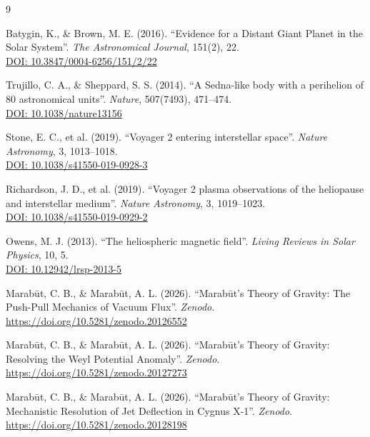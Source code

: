 \documentclass[11pt, a4paper]{article}
\newcommand{\doi}[1]{\href{https://doi.org/#1}{DOI: #1}}
\begin{document}
\clearpage
\begin{thebibliography}{9}

  Batygin, K., \& Brown, M. E. (2016). ``Evidence for a Distant Giant Planet in the Solar System''. \textit{The Astronomical Journal}, 151(2), 22. \\
  \doi{10.3847/0004-6256/151/2/22}

  Trujillo, C. A., \& Sheppard, S. S. (2014). ``A Sedna-like body with a perihelion of 80 astronomical units''. \textit{Nature}, 507(7493), 471--474. \\
  \doi{10.1038/nature13156}

  Stone, E. C., et al. (2019). ``Voyager 2 entering interstellar space''. \textit{Nature Astronomy}, 3, 1013--1018. \\
  \doi{10.1038/s41550-019-0928-3}

  Richardson, J. D., et al. (2019). ``Voyager 2 plasma observations of the heliopause and interstellar medium''. \textit{Nature Astronomy}, 3, 1019--1023. \\
  \doi{10.1038/s41550-019-0929-2}

  Owens, M. J. (2013). ``The heliospheric magnetic field''. \textit{Living Reviews in Solar Physics}, 10, 5. \\
  \doi{10.12942/lrsp-2013-5}

  Marab\={u}t, C. B., \& Marab\={u}t, A. L. (2026). ``Marab\={u}t's Theory of Gravity: The Push-Pull Mechanics of Vacuum Flux''. \textit{Zenodo}. \\
  \url{https://doi.org/10.5281/zenodo.20126552}

  Marab\={u}t, C. B., \& Marab\={u}t, A. L. (2026). ``Marab\={u}t's Theory of Gravity: Resolving the Weyl Potential Anomaly''. \textit{Zenodo}. \\
  \url{https://doi.org/10.5281/zenodo.20127273}

  Marab\={u}t, C. B., \& Marab\={u}t, A. L. (2026). ``Marab\={u}t's Theory of Gravity: Mechanistic Resolution of Jet Deflection in Cygnus X-1''. \textit{Zenodo}. \\
  \url{https://doi.org/10.5281/zenodo.20128198}


\end{thebibliography}
\end{document}
